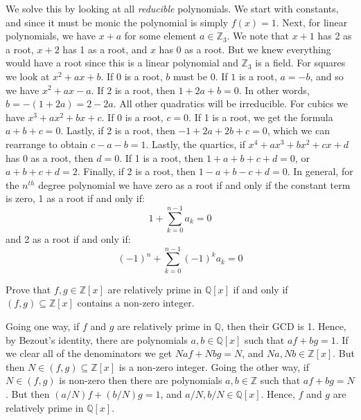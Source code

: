 \documentclass{article}                                                        %
\begin{document}
    \begin{solution}
        We solve this by looking at all \textit{reducible} polynomials.
        We start with constants, and since it must be monic the polynomial is
        simply $f(x)=1$. Next, for linear polynomials, we have
        $x+a$ for some element $a\in\mathbb{Z}_{3}$. We note that
        $x+1$ has 2 as a root, $x+2$ has 1 as a root, and $x$ has 0 as a root.
        But we knew everything would have a root since this is a linear
        polynomial and $\mathbb{Z}_{3}$ is a field. For squares we look at
        $x^{2}+ax+b$. If 0 is a root, $b$ must be 0. If $1$ is a root,
        $a=\minus{b}$, and so we have $x^{2}+ax-a$. If $2$ is a root, then
        $1+2a+b=0$. In other words, $b=\minus(1+2a)=2-2a$. All other quadratics
        will be irreducible. For cubics we have
        $x^{3}+ax^{2}+bx+c$. If 0 is a root, $c=0$. If 1 is a root, we get the
        formula $a+b+c=0$. Lastly, if 2 is a root, then $\minus{1}+2a+2b+c=0$,
        which we can rearrange to obtain $c-a-b=1$. Lastly, the
        quartics, if $x^{4}+ax^{3}+bx^{2}+cx+d$ has 0 as a root, then $d=0$.
        If 1 is a root, then $1+a+b+c+d=0$, or $a+b+c+d=2$. Finally, if 2 is a
        root, then $1-a+b-c+d=0$. In general, for the $n^{th}$ degree polynomial
        we have zero as a root if and only if the constant term is zero, 1 as a
        root if and only if:
        \begin{equation}
            1+\sum_{k=0}^{n-1}a_{k}=0
        \end{equation}
        and 2 as a root if and only if:
        \begin{equation}
            (\minus{1})^{n}+\sum_{k=0}^{n-1}(\minus{1})^{k}a_{k}=0
        \end{equation}
    \end{solution}
    \begin{problem}
        Prove that $f,g\in\mathbb{Z}[x]$ are relatively prime in $\mathbb{Q}[x]$
        if and only if $(f,g)\subseteq\mathbb{Z}[x]$ contains a non-zero
        integer.
    \end{problem}
    \begin{solution}
        Going one way, if $f$ and $g$ are relatively prime in $\mathbb{Q}$, then
        their GCD is 1. Hence, by Bezout's identity, there are polynomials
        $a,b\in\mathbb{Q}[x]$ such that $af+bg=1$. If we clear all of the
        denominators we get $Naf+Nbg=N$, and $Na,Nb\in\mathbb{Z}[x]$. But then
        $N\in(f,g)\subseteq\mathbb{Z}[x]$ is a non-zero integer. Going the other
        way, if $N\in(f,g)$ is non-zero then there are polynomials
        $a,b\in\mathbb{Z}$ such that $af+bg=N$. But then
        $(a/N)f+(b/N)g=1$, and $a/N,b/N\in\mathbb{Q}[x]$. Hence, $f$ and $g$ are
        relatively prime in $\mathbb{Q}[x]$.
    \end{solution}
\end{document}
